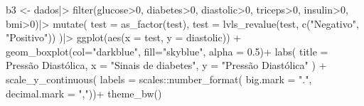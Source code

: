 \documentclass[
  letterpaper,
  DIV=11,
  numbers=noendperiod]{scrartcl}
\newenvironment{Shaded}{\begin{snugshade}}{\end{snugshade}}
\newcommand{\AttributeTok}[1]{\textcolor[rgb]{0.40,0.45,0.13}{#1}}
\newcommand{\DecValTok}[1]{\textcolor[rgb]{0.68,0.00,0.00}{#1}}
\newcommand{\FloatTok}[1]{\textcolor[rgb]{0.68,0.00,0.00}{#1}}
\newcommand{\FunctionTok}[1]{\textcolor[rgb]{0.28,0.35,0.67}{#1}}
\newcommand{\NormalTok}[1]{\textcolor[rgb]{0.00,0.23,0.31}{#1}}
\newcommand{\OtherTok}[1]{\textcolor[rgb]{0.00,0.23,0.31}{#1}}
\newcommand{\SpecialCharTok}[1]{\textcolor[rgb]{0.37,0.37,0.37}{#1}}
\newcommand{\StringTok}[1]{\textcolor[rgb]{0.13,0.47,0.30}{#1}}
\begin{document}
\begin{Shaded}
\begin{Highlighting}[]
\NormalTok{b3 }\OtherTok{\textless{}{-}}\NormalTok{ dados}\SpecialCharTok{|\textgreater{}}
  \FunctionTok{filter}\NormalTok{(glucose}\SpecialCharTok{\textgreater{}}\DecValTok{0}\NormalTok{, diabetes}\SpecialCharTok{\textgreater{}}\DecValTok{0}\NormalTok{, diastolic}\SpecialCharTok{\textgreater{}}\DecValTok{0}\NormalTok{,}
\NormalTok{         triceps}\SpecialCharTok{\textgreater{}}\DecValTok{0}\NormalTok{, insulin}\SpecialCharTok{\textgreater{}}\DecValTok{0}\NormalTok{, bmi}\SpecialCharTok{\textgreater{}}\DecValTok{0}\NormalTok{)}\SpecialCharTok{|\textgreater{}}
  \FunctionTok{mutate}\NormalTok{(}
    \AttributeTok{test =} \FunctionTok{as\_factor}\NormalTok{(test),}
    \AttributeTok{test =} \FunctionTok{lvls\_revalue}\NormalTok{(test, }\FunctionTok{c}\NormalTok{(}\StringTok{"Negativo"}\NormalTok{, }\StringTok{"Positivo"}\NormalTok{))}
\NormalTok{  )}\SpecialCharTok{|\textgreater{}}
  \FunctionTok{ggplot}\NormalTok{(}\FunctionTok{aes}\NormalTok{(}\AttributeTok{x =}\NormalTok{ test, }\AttributeTok{y =}\NormalTok{ diastolic)) }\SpecialCharTok{+}
  \FunctionTok{geom\_boxplot}\NormalTok{(}\AttributeTok{col=}\StringTok{"darkblue"}\NormalTok{, }\AttributeTok{fill=}\StringTok{"skyblue"}\NormalTok{, }\AttributeTok{alpha =} \FloatTok{0.5}\NormalTok{)}\SpecialCharTok{+}
  \FunctionTok{labs}\NormalTok{(}
    \AttributeTok{title =} \StringTok{\textquotesingle{}Pressão Diastólica\textquotesingle{}}\NormalTok{,}
    \AttributeTok{x =} \StringTok{"Sinais de diabetes"}\NormalTok{,}
    \AttributeTok{y =} \StringTok{"Pressão Diastólica"}
\NormalTok{  ) }\SpecialCharTok{+}
  \FunctionTok{scale\_y\_continuous}\NormalTok{(}
    \AttributeTok{labels =}\NormalTok{ scales}\SpecialCharTok{::}\FunctionTok{number\_format}\NormalTok{(}
      \AttributeTok{big.mark =} \StringTok{"."}\NormalTok{,}
      \AttributeTok{decimal.mark =} \StringTok{","}\NormalTok{))}\SpecialCharTok{+}
  \FunctionTok{theme\_bw}\NormalTok{()}


\end{Highlighting}
\end{Shaded}
\end{document}
